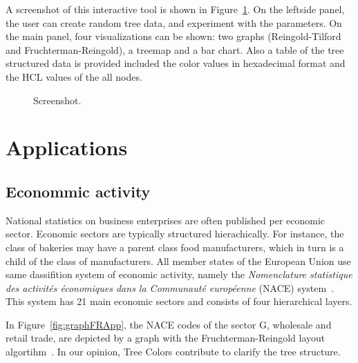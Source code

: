 \documentclass[journal]{vgtc}                %
\begin{document}
A screenshot of this interactive tool is shown in Figure~\ref{fig:screen}. On the leftside panel, the user can create random tree data, and experiment with the parameters. On the main panel, four visualizations can be shown: two graphs (Reingold-Tilford and Fruchterman-Reingold), a treemap and a bar chart. Also a table of the tree structured data is provided included the color values in hexadecimal format and the HCL values of the all nodes.

\begin{figure}[tb]
  \centering
  \caption{Screenshot.}\label{fig:screen}
\end{figure}



\section{Applications}\label{secapplication}

\subsection{Econommic activity}

National statistics on business enterprises are often published per economic sector. Economic sectors are typically structured hierachically. For instance, the class of bakeries may have a parent class food manufacturers, which in turn is a child of the class of manufacturers. All member states of the European Union use same dassifition system of economic activity, namely the \textit{Nomenclature statistique des activit\'es \'economiques dans la Communaut\'e europ\'eenne} (NACE) system~\cite{nace}. This system has 21 main economic sectors and consists of four hierarchical layers.


In Figure~\ref{fig:graphFRApp}, the NACE codes of the sector G, wholesale and retail trade, are depicted by a graph with the Fruchterman-Reingold layout algortihm~\cite{Fruchterman91}. In our opinion, Tree Colors contribute to clarify the tree structure.
\end{document}
